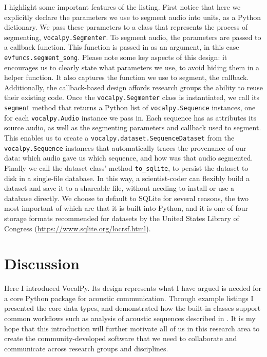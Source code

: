 \documentclass[11pt]{article}
\begin{document}
I highlight some important features of the listing. First notice that here we explicitly declare the parameters we use to segment audio into units, as a Python dictionary. We pass these parameters to a class that represents the process of segmenting, \texttt{vocalpy.Segmenter}. To segment audio, the parameters are passed to a callback function. This function is passed in as an argument, in this case \texttt{evfuncs.segment\_song}. Please note some key aspects of this design: it encourages us to clearly state what parameters we use, to avoid hiding them in a helper function. It also captures the function we use to segment, the callback. Additionally, the callback-based design affords research groups the ability to reuse their existing code. Once the \texttt{vocalpy.Segmenter} class is instantiated, we call its \texttt{segment} method that returns a Python list of \texttt{vocalpy.Sequence} instances, one for each \texttt{vocalpy.Audio} instance we pass in. Each sequence has as attributes its source audio, as well as the segmenting parameters and callback used to segment. This enables us to create a \texttt{vocalpy.dataset.SequenceDataset} from the \texttt{vocalpy.Sequence} instances that automatically traces the provenance of our data: which audio gave us which sequence, and how was that audio segmented. Finally we call the dataset class' method \texttt{to\_sqlite}, to persist the dataset to disk in a single-file database. In this way, a scientist-coder can flexibly build a dataset and save it to a shareable file, without needing to install or use a database directly. We choose to default to SQLite for several reasons, the two most important of which are that it is built into Python, and it is one of four storage formats recommended for datasets by the United States Library of Congress (\url{https://www.sqlite.org/locrsf.html}).

\section{Discussion}

Here I introduced VocalPy. Its design represents what I have argued is needed for a core Python package for acoustic communication. Through example listings I presented the core data types, and demonstrated how the built-in classes support common workflows such as analysis of acoustic sequences described in \cite{kershenbaumAcousticSequencesNonhuman2016}. It is my hope that this introduction will further motivate all of us in this research area to create the community-developed software that we need to collaborate and communicate across research groups and disciplines.


\end{document}
